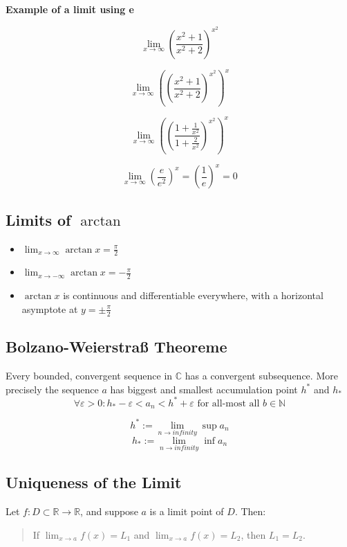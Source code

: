 \textbf{Example of a limit using e}

\[
\lim_{x \to \infty}{\left(\frac{x^2 + 1}{x^2 +2}\right)}^{x^2}
\]

\[
\lim_{x \to \infty} {\left({\left(\frac{x^2 + 1}{x^2 +2}\right)}^{x^2}\right)}^x
\]

\[
\lim_{x \to \infty} {\left({\left(\frac{1 + \frac{1}{x^2}}{1 + \frac{2}{x^2}}\right)}^{x^2}\right)}^x
\]

\[
\lim_{x \to \infty} {\left(\frac{e}{e^2}\right)}^x = {\left(\frac{1}{e}\right)}^x = 0
\]


\subsection{Limits of \texorpdfstring{\(\arctan\)}{arctan}}

\begin{itemize}[label=\(-\)]
\item \(\displaystyle \lim_{x \to \infty} \arctan x = \frac{\pi}{2}\)
\item \(\displaystyle \lim_{x \to -\infty} \arctan x = -\frac{\pi}{2}\)
\item \(\arctan x\) is continuous and differentiable everywhere, with a horizontal asymptote at \(y = \pm \frac{\pi}{2}\)
\end{itemize}

\subsection{Bolzano-Weierstraß Theoreme}

Every bounded, convergent sequence in \(\mathbb{C}\) has a convergent subsequence.
More precisely the sequence \(a\) has biggest and smallest accumulation point \(h^*\) and \(h_*\)
\[\forall \varepsilon > 0 : h_* - \varepsilon < a_n < h^{*} + \varepsilon \text{ for all-most all } b \in \mathbb{N}\]

\[h^* := \lim_{n \to infinity} \sup a_n\]
\[h_* := \lim_{n \to infinity} \inf a_n\]

\subsection{Uniqueness of the Limit}

Let \( f: D \subset \mathbb{R} \to \mathbb{R} \), and suppose \( a \) is a limit point of \( D \). Then:

\begin{quote}
If \( \lim_{x \to a} f(x) = L_1 \) and \( \lim_{x \to a} f(x) = L_2 \), then \( L_1 = L_2 \).
\end{quote}

